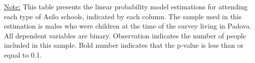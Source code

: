 \begin{footnotesize}
\noindent\underline{Note:} This table presents the linear probability model estimations for attending each type of Asilo schools, indicated by each column. The sample used in this estimation is males who were children at the time of the survey living in Padova. All dependent variables are binary. Observation indicates the number of people included in this sample. Bold number indicates that the p-value is less than or equal to 0.1.
\end{footnotesize}
